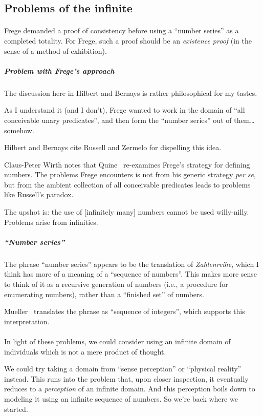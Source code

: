 \subsection{Problems of the infinite}

\paragraph{}
Frege demanded a proof of consistency before using a ``number series''
as a completed totality. For Frege, such a proof should be an
\emph{existence proof} (in the sense of a method of exhibition).

\subparagraph{Problem with Frege's approach}
The discussion here in Hilbert and Bernays is rather philosophical for
my tastes.

As I understand it (and I don't), Frege wanted to work in the domain
of ``all conceivable unary predicates'', and then form the ``number series''
out of them\dots somehow.

Hilbert and Bernays cite Russell and Zermelo for dispelling this idea.

Claus-Peter Wirth notes that Quine~\cite{quine1981mathematical}
re-examines Frege's strategy for defining numbers. The problems Frege
encounters is not from his generic strategy \emph{per se}, but from
the ambient collection of all conceivable predicates leads to problems
like Russell's paradox.

The upshot is: the use of [infinitely many] numbers cannot be used
willy-nilly. Problems arise from infinities.

\subparagraph{``Number series''}
The phrase ``number series'' appears to be the translation of
\textit{Zahlenreihe}, which I think has more of a meaning of a
``sequence of numbers''. This makes more sense to think of it as a
recursive generation of numbers (i.e., a procedure for enumerating
numbers), rather than a ``finished set'' of numbers.

Mueller~\cite{mueller2006grundlagen} translates the phrase as
``sequence of integers'', which supports this interpretation.

\paragraph{}
In light of these problems, we could consider using an infinite domain
of individuals which is not a mere product of thought.

We could try taking a domain from ``sense perception'' or ``physical reality''
instead. This runs into the problem that, upon closer inspection, it
eventually reduces to a \emph{perception} of an infinite domain. And
this perception boils down to modeling it using an infinite sequence
of numbers. So we're back where we started.

